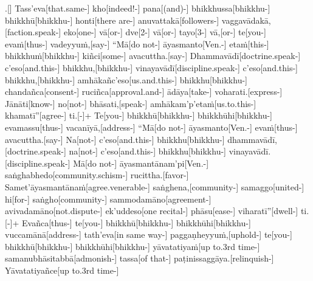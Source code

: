 \documentclass[12pt]{article}
\begin{document}
\begin{paracol}{2}
\begin{column}
\begin{flushleft}
.[] Tass’eva[that.same-] kho[indeed!-] pana[(and)-] bhikkhussa[bhikkhu-] bhikkhū[bhikkhu-] honti[there are-] anuvattakā[followers-] vaggavādakā,[faction.speak-] eko[one-] vā[or-] dve[2-] vā[or-] tayo[3-] vā,[or-] te[you-] evaṁ[thus-] vadeyyuṁ,[say-] “Mā[do not-] āyasmanto[Ven.-] etaṁ[this-] bhikkhuṁ[bhikkhu-] kiñci[some-] avacuttha.[say-] Dhammavādī[doctrine.speak-] c’eso[and.this-] bhikkhu,[bhikkhu-] vinayavādī[discipline.speak-] c’eso[and.this-] bhikkhu,[bhikkhu-] amhākañc’eso[us.and.this-] bhikkhu[bhikkhu-] chandañca[consent-] ruciñca[approval.and-] ādāya[take-] voharati.[express-] Jānāti[know-] no[not-] bhāsati,[speak-] amhākam’p’etaṁ[us.to.this-] khamatī”[agree-] ti.[-\NUL{\GMU{}}]+ Te[you-] bhikkhū[bhikkhu-] bhikkhūhi[bhikkhu-] evamassu[thus-\NUL{\GMU{}}] vacanīyā,[address-] “Mā[do not-] āyasmanto[Ven.-] evaṁ[thus-] avacuttha.[say-] Na[not-] c’eso[and.this-] bhikkhu[bhikkhu-] dhammavādī,[doctrine.speak-] na[not-] c’eso[and.this-] bhikkhu[bhikkhu-] vinayavādī.[discipline.speak-] Mā[do not-] āyasmantānam’pi[Ven.-] saṅghabhedo[community.schism-] rucittha.[favor-] Samet’āyasmantānaṁ[agree.venerable-] saṅghena,[community-] samaggo[united-] hi[for-] saṅgho[community-] sammodamāno[agreement-] avivadamāno[not.dispute-] ek’uddeso[one recital-] phāsu[ease-] viharatī”[dwell-] ti.[-\NUL{\GMU{}}]+ Evañca[thus-] te[you-] bhikkhū[bhikkhu-] bhikkhūhi[bhikkhu-] vuccamānā[address-] tath’eva[in same way-\NUL{\GMU{}}] paggaṇheyyuṁ,[uphold-] te[you-] bhikkhū[bhikkhu-] bhikkhūhi[bhikkhu-] yāvatatiyaṁ[up to.3rd time-] samanubhāsitabbā[admonish-] tassa[of that-] paṭinissaggāya.[relinquish-] Yāvatatiyañce[up to.3rd time-] 
\end{flushleft}
\end{column}
\end{paracol}
\end{document}
